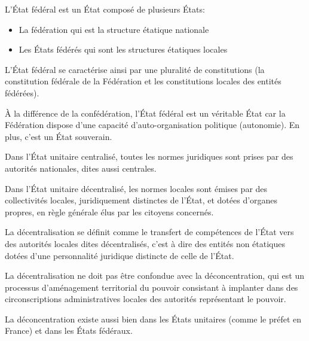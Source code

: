 \documentclass[12pt, a4paper, openany]{book}
\begin{document}
L'État fédéral est un État composé de plusieurs États:
\begin{itemize}
\item La fédération qui est la structure étatique nationale
\item Les États fédérés qui sont les structures étatiques locales
\end{itemize}

L'État fédéral se caractérise ainsi par une pluralité de constitutions (la constitution fédérale de la Fédération et les constitutions locales des entités fédérées).

À la différence de la confédération, l'État fédéral est un véritable État car la Fédération dispose d'une capacité d'auto-organisation politique (autonomie). En plus, c'est un État souverain.


Dans l'État unitaire centralisé, toutes les normes juridiques sont prises par des autorités nationales, dites aussi centrales.

Dans l'État unitaire décentralisé, les normes locales sont émises par des collectivités locales, juridiquement distinctes de l'État, et dotées d'organes propres, en règle générale élus par les citoyens concernés.

La décentralisation se définit comme le transfert de compétences de l'État vers des autorités locales dites décentralisés, c'est à dire des entités non étatiques dotées d'une personnalité juridique distincte de celle de l'État.

La décentralisation ne doit pas être confondue avec la déconcentration, qui est un processus d'aménagement territorial du pouvoir consistant à implanter dans des circonscriptions administratives locales des autorités représentant le pouvoir.

La déconcentration existe aussi bien dans les États unitaires (comme le préfet en France) et dans les États fédéraux.
\end{document}
